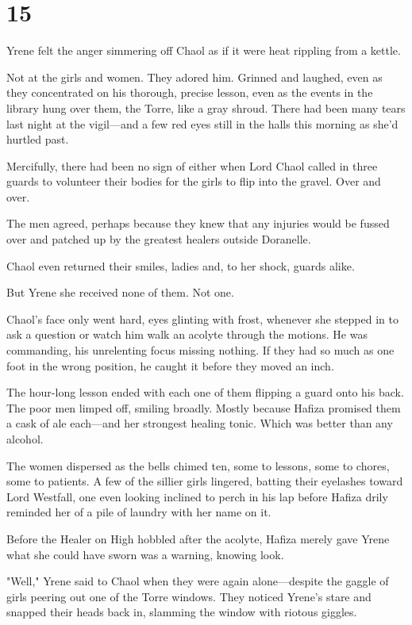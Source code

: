 
\chapter{15}

Yrene felt the anger simmering off Chaol as if it were heat rippling from a kettle.

Not at the girls and women. They adored him. Grinned and laughed, even as they concentrated on his thorough, precise lesson, even as the events in the library hung over them, the Torre, like a gray shroud. There had been many tears last night at the vigil---and a few red eyes still in the halls this morning as she'd hurtled past.

Mercifully, there had been no sign of either when Lord Chaol called in three guards to volunteer their bodies for the girls to flip into the gravel. Over and over.

The men agreed, perhaps because they knew that any injuries would be fussed over and patched up by the greatest healers outside Doranelle.

Chaol even returned their smiles, ladies and, to her shock, guards alike.

But Yrene  she received none of them. Not one.

Chaol's face only went hard, eyes glinting with frost, whenever she stepped in to ask a question or watch him walk an acolyte through the motions. He was commanding, his unrelenting focus missing nothing. If they had so much as one foot in the wrong position, he caught it before they moved an inch.

The hour-long lesson ended with each one of them flipping a guard onto his back. The poor men limped off, smiling broadly. Mostly because Hafiza promised them a cask of ale each---and her strongest healing tonic. Which was better than any alcohol.

The women dispersed as the bells chimed ten, some to lessons, some to chores, some to patients. A few of the sillier girls lingered, batting their eyelashes toward Lord Westfall, one even looking inclined to perch in his lap before Hafiza drily reminded her of a pile of laundry with her name on it.

Before the Healer on High hobbled after the acolyte, Hafiza merely gave Yrene what she could have sworn was a warning, knowing look.

"Well," Yrene said to Chaol when they were again alone---despite the gaggle of girls peering out one of the Torre windows. They noticed Yrene's stare and snapped their heads back in, slamming the window with riotous giggles.

